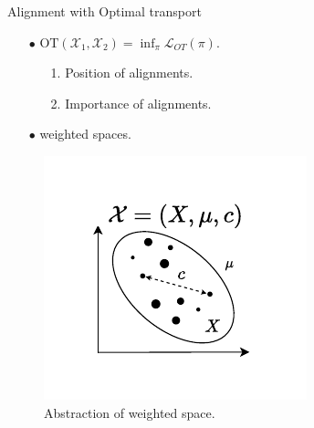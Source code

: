 \documentclass{beamer}
\newcommand{\ot}{\text{OT}}
\newcommand{\cX}{\mathcal X}
\newcommand{\cL}{\mathcal L}
\begin{document}
\begin{frame}{Alignment with Optimal transport}
  \vspace*{0.5cm}
  \scriptsize
  \begin{itemize}
    \setlength\itemsep{0.5cm}

    \item[$\bullet$] {}
    $\ot(\cX_1, \cX_2) = \inf_{\pi} \cL_{OT}(\pi)$.
    \vspace*{0.2cm}
    \begin{enumerate}
      \scriptsize
      \setlength\itemindent{10pt}
      \setlength\itemsep{0.2cm}
      \item[1.] Position of alignments.
      \item[2.] Importance of alignments.
    \end{enumerate}
    \item[$\bullet$] {} weighted spaces.
  \end{itemize}

  \vspace*{-1cm}
  \begin{figure}
    \centering
    \includegraphics[width=0.65\linewidth, keepaspectratio=true]{OT_new/intro_new2.pdf}
    \vspace*{-1.2cm}
    \caption*{\scriptsize{Abstraction of weighted space.}}
  \end{figure}


\end{frame}
\end{document}
